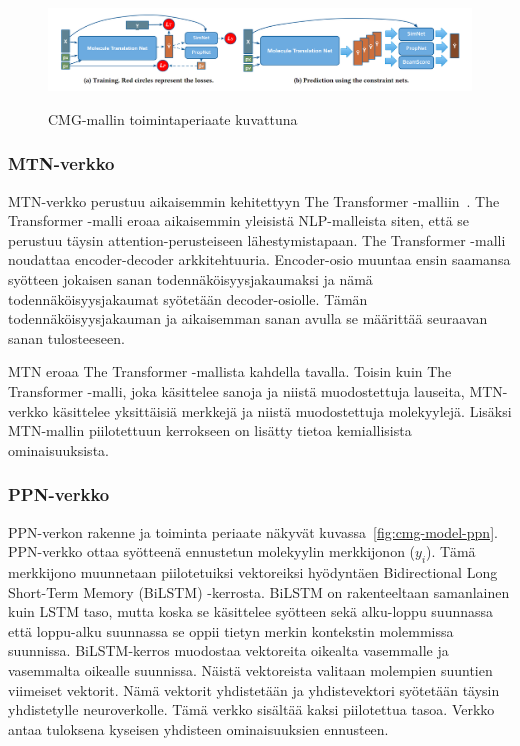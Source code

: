\documentclass[finnish,twoside,censored,tkt,sw-line]{HYthesisML}
\begin{document}
\begin{figure}[!ht]
    \centering
    \includegraphics[width=\textwidth]{CMG-fig.png}
    \caption{CMG-mallin toimintaperiaate kuvattuna}
    {\cite{ShinBonggun}}
    {\label{fig:cmg-model-whole}}
\end{figure}

\subsubsection{MTN-verkko}

MTN-verkko perustuu aikaisemmin kehitettyyn The Transformer -malliin~\cite{TheTransformer}.
The Transformer -malli eroaa aikaisemmin yleisistä NLP-malleista siten, että se perustuu täysin attention-perusteiseen lähestymistapaan.
The Transformer -malli noudattaa encoder-decoder arkkitehtuuria.
Encoder-osio muuntaa ensin saamansa syötteen jokaisen sanan todennäköisyysjakaumaksi ja nämä todennäköisyysjakaumat syötetään decoder-osiolle.
Tämän todennäköisyysjakauman ja aikaisemman sanan avulla se määrittää seuraavan sanan tulosteeseen.

MTN eroaa The Transformer -mallista kahdella tavalla.
Toisin kuin The Transformer -malli, joka käsittelee sanoja ja niistä muodostettuja lauseita, MTN-verkko käsittelee yksittäisiä merkkejä ja niistä muodostettuja molekyylejä.
Lisäksi MTN-mallin piilotettuun kerrokseen on lisätty tietoa kemiallisista ominaisuuksista.

\subsubsection{PPN-verkko}

PPN-verkon rakenne ja toiminta periaate näkyvät kuvassa~\ref{fig:cmg-model-ppn}.
PPN-verkko ottaa syötteenä ennustetun molekyylin merkkijonon (\(y_i\)).
Tämä merkkijono muunnetaan piilotetuiksi vektoreiksi hyödyntäen Bidirectional Long Short-Term Memory (BiLSTM) -kerrosta.
BiLSTM on rakenteeltaan samanlainen kuin LSTM taso, mutta koska se käsittelee syötteen sekä alku-loppu suunnassa että loppu-alku suunnassa se oppii tietyn merkin kontekstin molemmissa suunnissa.
BiLSTM-kerros muodostaa vektoreita oikealta vasemmalle ja vasemmalta oikealle suunnissa.
Näistä vektoreista valitaan molempien suuntien viimeiset vektorit.
Nämä vektorit yhdistetään ja yhdistevektori syötetään täysin yhdistetylle neuroverkolle.
Tämä verkko sisältää kaksi piilotettua tasoa.
Verkko antaa tuloksena kyseisen yhdisteen ominaisuuksien ennusteen.
\end{document}
